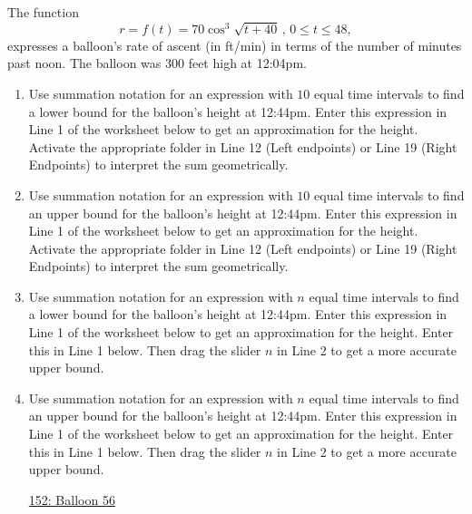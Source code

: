 \documentclass{ximera}
\begin{document}
\begin{question} \label{QOErermern333}
The function
\[
 r = f(t) = 70 \cos^3 \sqrt{t+40} \, , \, 0\leq t \leq 48,
\]
expresses a balloon’s rate of ascent (in ft/min) in terms of the number of minutes past noon. The balloon was 300 feet high at 12:04pm.

\begin{enumerate}
\item Use summation notation for an expression with $10$ equal time intervals to find a lower bound for the balloon's height at 12:44pm. Enter this expression in Line 1 of the worksheet below to get an  approximation for the height. Activate the appropriate folder in Line 12 (Left endpoints) or Line 19 (Right Endpoints) to interpret the sum geometrically.

\item Use summation notation for an expression with $10$ equal time intervals to find an upper bound for the balloon's height at 12:44pm. Enter this expression in Line 1 of the worksheet below to get an  approximation for the  height. Activate the appropriate folder in Line 12 (Left endpoints) or Line 19 (Right Endpoints) to interpret the sum geometrically.


\item Use summation notation for an expression with $n$ equal time intervals to find a lower bound for the balloon's height at 12:44pm. Enter this expression in Line 1 of the worksheet below to get an  approximation for the height. Enter this in Line 1 below. Then drag the slider $n$ in Line 2 to get a more accurate upper bound.

\item Use summation notation for an expression with $n$ equal time intervals to find an upper bound for the balloon's height at 12:44pm. Enter this expression in Line 1 of the worksheet below to get an  approximation for the height. Enter this in Line 1 below. Then drag the slider $n$ in Line 2 to get a more accurate upper bound.

\begin{onlineOnly}
    \begin{center}
\end{center}
\end{onlineOnly}
 
\href{https://www.desmos.com/calculator/qwuqprd9vf}{152: Balloon 56}
 
\end{enumerate}
\end{question}
\end{document}
